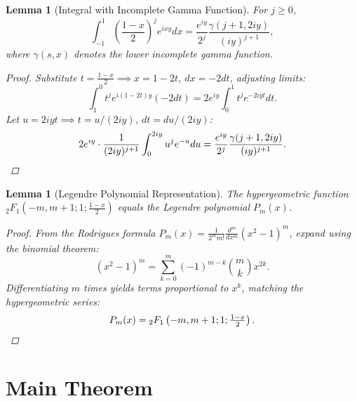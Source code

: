 \documentclass[12pt]{article}
\newtheorem{lemma}[theorem]{Lemma}
\begin{document}
\begin{lemma}[Integral with Incomplete Gamma Function]\label{lem:IntegralGamma}
For \( j \geq 0 \),
\[
\int_{-1}^1 \left(\frac{1-x}{2}\right)^j e^{ixy}dx = \frac{e^{iy}}{2^j}\frac{\gamma(j+1,2iy)}{(iy)^{j+1}},
\]
where \(\gamma(s, x)\) denotes the lower incomplete gamma function.

\begin{proof}
Substitute \( t = \frac{1 - x}{2} \implies x = 1 - 2t \), \( dx = -2dt \), adjusting limits:
\[
\int_{1}^{0} t^j e^{i(1 - 2t)y} (-2dt) = 2e^{iy} \int_{0}^{1} t^j e^{-2iyt} dt.
\]
Let \( u = 2iyt \implies t = u/(2iy) \), \( dt = du/(2iy) \):
\[
2e^{iy} \cdot \frac{1}{(2iy)^{j+1}} \int_{0}^{2iy} u^j e^{-u} du = \frac{e^{iy}}{2^j}\frac{\gamma(j+1,2iy)}{(iy)^{j+1}}. \qedhere
\]
\end{proof}
\end{lemma}


\begin{lemma}[Legendre Polynomial Representation]\label{lem:Legendre}
The hypergeometric function \( {}_2F_1(-m, m+1; 1; \tfrac{1-x}{2}) \) equals the Legendre polynomial \( P_m(x) \).

\begin{proof}
From the Rodrigues formula \( P_m(x) = \frac{1}{2^m m!} \frac{d^m}{dx^m} (x^2 - 1)^m \), expand using the binomial theorem:
\[
(x^2 - 1)^m = \sum_{k=0}^m (-1)^{m-k} \binom{m}{k} x^{2k}.
\]
Differentiating \( m \) times yields terms proportional to \( x^k \), matching the hypergeometric series:
\[
P_m(x) = {}_2F_1\left(-m, m+1; 1; \tfrac{1 - x}{2}\right). \qedhere
\]
\end{proof}
\end{lemma}


\section{Main Theorem}
\end{document}
